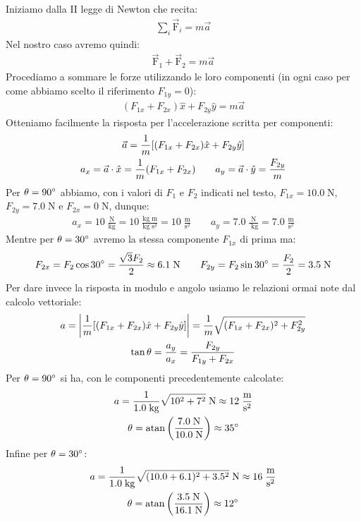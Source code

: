 \documentclass[12pt,a4paper]{book}
\begin{document}
Iniziamo dalla II legge di Newton che recita:
%
\begin{gather*}
\sum_i\vec{\text{F}}_i=m\vec{a}
\end{gather*}
%
Nel nostro caso avremo quindi:
%
\begin{gather*}
\vec{\text{F}}_1+\vec{\text{F}}_2=m\vec{a}
\end{gather*}
%
Procediamo a sommare le forze utilizzando le loro componenti (in ogni caso per come abbiamo scelto il riferimento $F_{1y}=0$):
%
\begin{gather*}
(F_{1x}+F_{2x})\hat{x}+F_{2y}\hat{y}=m\vec{a}
\end{gather*}
%
Otteniamo facilmente la risposta per l'accelerazione scritta per componenti:
%
\begin{gather*}
\vec{a}=\frac{1}{m}\qty[(F_{1x}+F_{2x})\hat{x}+F_{2y}\hat{y}] \\
a_x=\vec{a}\cdot\hat{x}=\frac{1}{m}(F_{1x}+F_{2x}) \qquad a_y=\vec{a}\cdot\hat{y}=\frac{F_{2y}}{m}
\end{gather*}
%
Per $\theta=90\degree$ abbiamo, con i valori di $F_1$ e $F_2$ indicati nel testo, $F_{1x}=10.0\;\text{N}$, $F_{2y}=7.0\;\text{N}$ e $F_{2x}=0\;\text{N}$, dunque:
%
\begin{gather*}
a_x=10\;\frac{\text{N}}{\text{kg}}=10\;\frac{\text{kg}\;\text{m}}{\text{kg}\;\text{s}^2}=10\;\frac{\text{m}}{\text{s}^2} \qquad a_y=7.0\;\frac{\text{N}}{\;\text{kg}}=7.0\;\frac{\text{m}}{\text{s}^2}
\end{gather*}
%
Mentre per $\theta=30\degree$ avremo la stessa componente $F_{1x}$ di prima ma:
%
\begin{gather*}
F_{2x}=F_2\cos30\degree=\frac{\sqrt{3}F_2}{2}\approx 6.1\;\text{N} \qquad  F_{2y}=F_2\sin30\degree=\frac{F_2}{2} = 3.5\;\text{N}
\end{gather*}
%
Per dare invece la risposta in modulo e angolo usiamo le relazioni ormai note dal calcolo vettoriale:
%
\begin{gather*}
a=\qty|\frac{1}{m}\qty[(F_{1x}+F_{2x})\hat{x}+F_{2y}\hat{y}]|=\frac{1}{m}\sqrt{(F_{1x}+F_{2x})^2+F_{2y}^2} \\
\tan\theta=\frac{a_y}{a_x}=\frac{F_{2y}}{F_{1y}+F_{2x}}
\end{gather*}
%
Per $\theta=90\degree$ si ha, con le componenti precedentemente calcolate:
%
\begin{gather*}
a=\frac{1}{1.0\;\text{kg}}\sqrt{10^2+7^2}\;\text{N}\approx 12\;\frac{\text{m}}{\text{s}^2} \\
\theta=\atan\qty(\frac{7.0\;\text{N}}{10.0\;\text{N}})\approx 35 \degree
\end{gather*}
%
Infine per $\theta=30\degree$:
%
\begin{gather*}
a=\frac{1}{1.0\;\text{kg}}\sqrt{(10.0+6.1)^2+3.5^2}\;\text{N}\approx 16\;\frac{\text{m}}{\text{s}^2} \\
\theta=\atan\qty(\frac{3.5\;\text{N}}{16.1\;\text{N}})\approx 12 \degree
\end{gather*}
%
\end{document}
